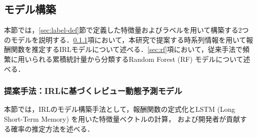 \documentclass[submit]{ipsj}
\begin{document}


\vspace{-4mm}
\subsection{モデル構築}

本節では，\ref{sec:label-def}節で定義した特徴量およびラベルを用いて構築する2つのモデルを説明する．\ref{sec:irl}項において，本研究で提案する時系列情報を用いて報酬関数を推定するIRLモデルについて述べる．\ref{sec:rf}項において，従来手法で頻繁に用いられる累積統計量から分類するRandom Forest (RF) モデルについて述べる．

\subsubsection{提案手法：IRLに基づくレビュー動態予測モデル}\label{sec:irl}

本節では，IRLのモデル構築手法として，報酬関数の定式化とLSTM (Long Short-Term Memory) を用いた特徴量ベクトルの計算，
および開発者が貢献する確率の推定方法を述べる．
\end{document}
